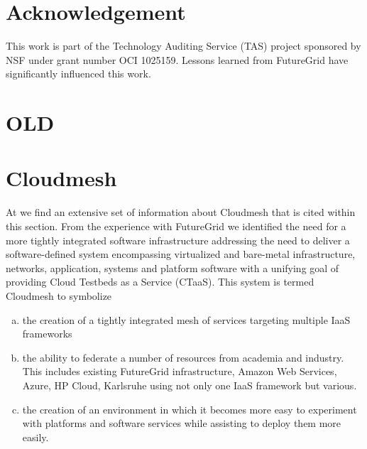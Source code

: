 \documentclass{tex/sig-alternate}
\begin{document}
 
\section*{Acknowledgement} 
 
This work is part of the Technology Auditing Service (TAS) project sponsored by NSF under grant number OCI 1025159. Lessons learned from FutureGrid have significantly influenced this work. 

\section{OLD}


\section{Cloudmesh}\label{S:cloudmesh}


At \cite{github-cloudmesh} we find an extensive set of information about Cloudmesh that is cited within this section. 
From the experience with FutureGrid we identified the need for a more tightly integrated software infrastructure addressing the need to deliver a software-defined system encompassing virtualized and bare-metal infrastructure, networks, application, systems and platform software with a unifying goal of providing Cloud Testbeds as a Service (CTaaS). This system is termed Cloudmesh to symbolize 


\begin{enumerate}[(a)]


\item the creation of a tightly integrated mesh of services targeting multiple IaaS frameworks 


\item the ability to federate a number of resources from academia and industry. This includes existing FutureGrid infrastructure, Amazon Web Services, Azure, HP Cloud, Karlsruhe using not only one IaaS framework but various. 


\item the creation of an environment in which it becomes more easy to experiment with platforms and software services while assisting to deploy them more easily.  


\end{enumerate}
\end{document}
